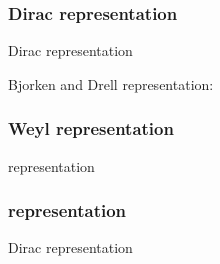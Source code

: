 \label{definition}
\begin{frame}\frametitle{Dirac representation}
Dirac representation

 Bjorken and Drell representation:

\end{frame}
\begin{frame}\frametitle{Weyl representation}
representation

\end{frame}
\begin{frame}\frametitle{ representation}
Dirac representation

\end{frame}
